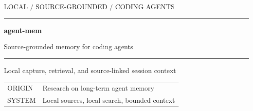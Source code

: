 \documentclass[aspectratio=169,11pt]{beamer}
\newcommand{\amlabel}[1]{\textcolor{amMuted}{\scriptsize\ttfamily #1}}
\newcommand{\amrule}{\textcolor{amLine}{\rule{\linewidth}{0.45pt}}}
\begin{document}
\begin{frame}[plain]
  \vspace*{0.70cm}
  \amlabel{LOCAL / SOURCE-GROUNDED / CODING AGENTS}
  \vspace{0.34cm}

  {\color{amGood}\rule{2.4cm}{1.5pt}}\par
  \vspace{0.26cm}

  {\fontsize{44}{50}\selectfont\ttfamily\bfseries agent-mem\par}
  \vspace{0.28cm}

  {\fontsize{24}{30}\selectfont\color{amText}Source-grounded memory for coding agents\par}
  \vspace{0.50cm}
  \amrule
  \vspace{0.25cm}

  {\large\color{amMuted}Local capture, retrieval, and source-linked session context\par}

  \vfill
  \begin{tabular}{@{}ll@{}}
    \amlabel{ORIGIN} & Research on long-term agent memory \\
    \amlabel{SYSTEM} & Local sources, local search, bounded context
  \end{tabular}
\end{frame}
\end{document}
